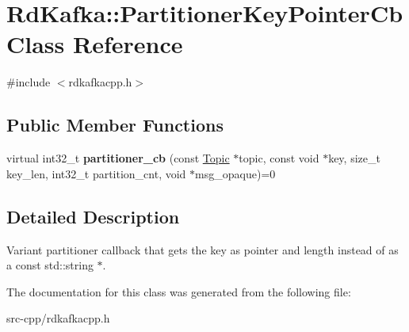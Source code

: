 \hypertarget{classRdKafka_1_1PartitionerKeyPointerCb}{\section{Rd\-Kafka\-:\-:Partitioner\-Key\-Pointer\-Cb Class Reference}
\label{classRdKafka_1_1PartitionerKeyPointerCb}
}


{\ttfamily \#include $<$rdkafkacpp.\-h$>$}

\subsection*{Public Member Functions}
\begin{DoxyCompactItemize}
\item 
\hypertarget{classRdKafka_1_1PartitionerKeyPointerCb_a344e51bd3974cc4808bfea02e45e94e1}{virtual int32\-\_\-t {\bfseries partitioner\-\_\-cb} (const \hyperlink{classRdKafka_1_1Topic}{Topic} $\ast$topic, const void $\ast$key, size\-\_\-t key\-\_\-len, int32\-\_\-t partition\-\_\-cnt, void $\ast$msg\-\_\-opaque)=0}\label{classRdKafka_1_1PartitionerKeyPointerCb_a344e51bd3974cc4808bfea02e45e94e1}

\end{DoxyCompactItemize}


\subsection{Detailed Description}
Variant partitioner callback that gets the key as pointer and length instead of as a const std\-::string $\ast$. 

The documentation for this class was generated from the following file\-:\begin{DoxyCompactItemize}
\item 
src-\/cpp/rdkafkacpp.\-h\end{DoxyCompactItemize}
